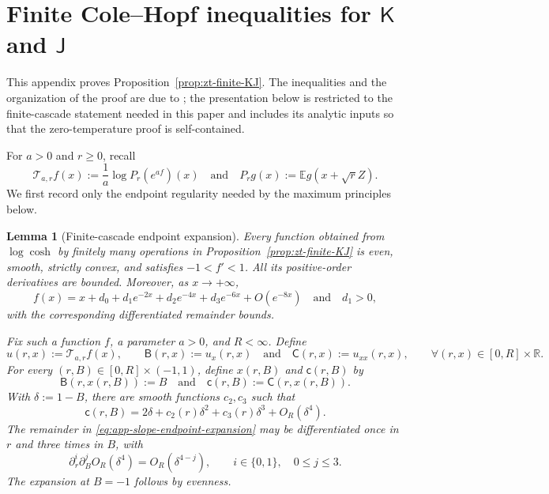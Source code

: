 \documentclass[10pt]{amsart}
\newtheorem{lemma}[lemma]{Lemma}
\theoremstyle{definition}
\theoremstyle{remark}
\numberwithin{equation}{section}
\newcommand{\R}{\mathbb R}
\newcommand{\E}{\mathbb E}
\newcommand{\1}{\mathbf 1}
\begin{document}
\section{\texorpdfstring{Finite Cole--Hopf inequalities for $\mathsf K$ and $\mathsf J$}{Finite Cole--Hopf inequalities for K and J}}
\label{app:finite-KJ}

This appendix proves Proposition~\ref{prop:zt-finite-KJ}. The inequalities and the organization of the proof are due to \cite[Section~3]{Lopatto2026}; the presentation below is restricted to the finite-cascade statement needed in this paper and includes its analytic inputs so that the zero-temperature proof is self-contained.

For $a>0$ and $r\geq0$, recall
\begin{equation}
 \mathcal T_{a,r}f(x)
 :=\frac1a\log P_r(e^{af})(x)
 \quad\text{and}\quad
 P_rg(x):=\E g(x+\sqrt r Z).
 \label{eq:app-Cole-Hopf}
\end{equation}
We first record only the endpoint regularity needed by the maximum principles below.

\begin{lemma}[Finite-cascade endpoint expansion]
\label{lem:app-endpoint-expansion}
Every function obtained from $\log\cosh$ by finitely many operations in Proposition~\ref{prop:zt-finite-KJ} is even, smooth, strictly convex, and satisfies $-1<f'<1$. All its positive-order derivatives are bounded. Moreover, as $x\to+\infty$,
\begin{equation}
 f(x)=x+d_0+d_1e^{-2x}+d_2e^{-4x}+d_3e^{-6x}
 +O(e^{-8x})\quad\text{and}\quad d_1>0,
 \label{eq:app-spatial-expansion}
\end{equation}
with the corresponding differentiated remainder bounds.

Fix such a function $f$, a parameter $a>0$, and $R<\infty$. Define
\begin{equation*}
 u(r,x):=\mathcal T_{a,r}f(x),\qquad \mathsf B(r,x):=u_x(r,x)
 \quad\text{and}\quad \mathsf C(r,x):=u_{xx}(r,x),
 \qquad \forall (r,x)\in[0,R]\times\R.
\end{equation*}
For every $(r,B)\in[0,R]\times(-1,1)$, define $x(r,B)$ and $\mathsf c(r,B)$ by
\begin{equation*}
 \mathsf B(r,x(r,B)):=B\quad\text{and}\quad \mathsf c(r,B):=\mathsf C(r,x(r,B)).
\end{equation*}
With $\delta:=1-B$, there are smooth functions $c_2,c_3$ such that
\begin{equation}
 \mathsf c(r,B)=2\delta+c_2(r)\delta^2+c_3(r)\delta^3
 +O_R(\delta^4).
 \label{eq:app-slope-endpoint-expansion}
\end{equation}
The remainder in \eqref{eq:app-slope-endpoint-expansion} may be differentiated once in $r$ and three times in $B$, with
\begin{equation}
 \partial_r^i\partial_B^jO_R(\delta^4)
 =O_R(\delta^{4-j}),
 \qquad i\in\{0,1\},\quad 0\leq j\leq3.
 \label{eq:app-slope-endpoint-remainder}
\end{equation}
The expansion at $B=-1$ follows by evenness.
\end{lemma}
\end{document}

